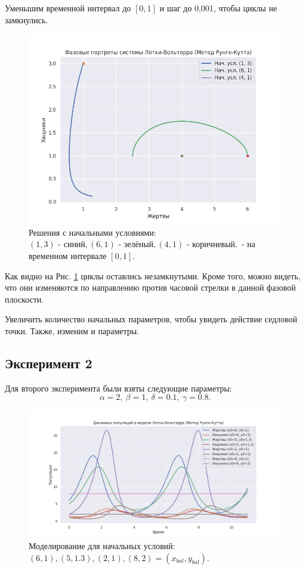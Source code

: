 Уменьшим временной интервал до $[0,1]$ и шаг до 0,001, чтобы циклы не замкнулись.
\begin{figure}[h]  %
	\centering
	\includegraphics[width=1\textwidth]{imgs/phase_1_1.png}  %
	\caption{Решения с начальными условиями: $(1,3)\text{ - синий}, (6,1)\text{ - зелёный}, (4,1)\text{ - коричневый}, $ - на временном интервале $[0,1]$.}  %
	\label{fig:phase_1_1}  %
\end{figure}

Как видно на Рис. \ref{fig:phase_1_1} циклы оставлись незамкнутыми. Кроме того, можно видеть, что они изменяются по направлению против часовой стрелки в данной фазовой плоскости.

Увеличить количество начальных параметров, чтобы увидеть действие седловой точки. Также, изменим и параметры.
\newpage
\subsection*{Эксперимент 2}
Для второго эксперимента были взяты следующие параметры: $$\alpha = 2, \ \beta = 1, \ \delta = 0.1, \ \gamma = 0.8.$$

\begin{figure}[h]  %
	\centering
	\includegraphics[width=1\textwidth]{imgs/pop_2.png}  %
	\caption{Моделирование для начальных условий: $(6, 1), (5,1.3), (2,1), (8,2) = (x_{bal}, y_{bal})$.}  %
	\label{fig:pop_2}  %
\end{figure}

